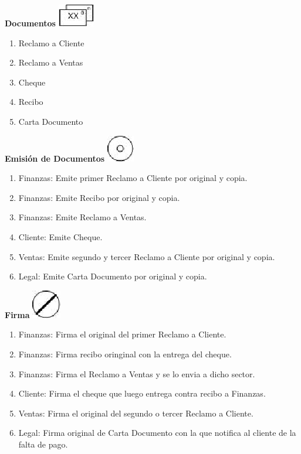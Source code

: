 \begin{center}
  \textbf{Documentos}
  \includegraphics{./Images/Simbolos/simbolo-Documentos.png}
\end{center}
\begin{enumerate}
\item Reclamo a Cliente
\item Reclamo a Ventas
\item Cheque
\item Recibo
\item Carta Documento
\end{enumerate}

\begin{center}
  \textbf{Emisión de Documentos}
  \includegraphics{./Images/Simbolos/simbolo-Emision-de-Documentos.png}
\end{center}
\begin{enumerate}
\item Finanzas: Emite primer Reclamo a Cliente por original y copia.
\item Finanzas: Emite Recibo por original y copia.
\item Finanzas: Emite Reclamo a Ventas.
\item Cliente: Emite Cheque.
\item Ventas: Emite segundo y tercer Reclamo a Cliente por original y copia.
\item Legal: Emite Carta Documento por original y copia.
\end{enumerate}

\begin{center}
  \textbf{Firma}
  \includegraphics{./Images/Simbolos/simbolo-Firma.png}
\end{center}
\begin{enumerate}
\item Finanzas: Firma el original del primer Reclamo a Cliente.
\item Finanzas: Firma recibo oringinal con la entrega del cheque.
\item Finanzas: Firma el Reclamo a Ventas y se lo envia a dicho sector.
\item Cliente: Firma el cheque que luego entrega contra recibo a Finanzas.
\item Ventas: Firma el original del segundo o tercer Reclamo a Cliente.
\item Legal: Firma original de Carta Documento con la que notifica al cliente de la falta de pago.
\end{enumerate}

